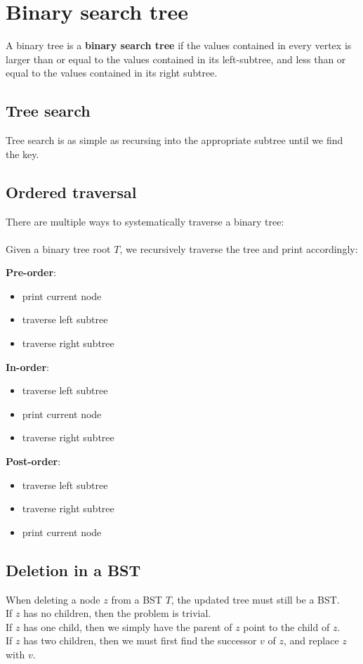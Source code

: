 \documentclass[a4paper]{article}
\begin{document}
\section{Binary search tree}
A binary tree is a \textbf{binary search tree} if the values contained in every vertex is larger than or equal to the values contained in its left-subtree, and less than or equal to the values contained in its right subtree.\\
\subsection{Tree search}
Tree search is as simple as recursing into the appropriate subtree until we find the key.
\subsection{Ordered traversal}
There are multiple ways to systematically traverse a binary tree:\\ \\
Given a binary tree root $T$, we recursively traverse the tree and print accordingly:
\begin{multicols}{3}
\textbf{Pre-order}:
\begin{itemize}
	\itemsep0em
	\item print current node
	\item traverse left subtree
	\item traverse right subtree
\end{itemize}
\textbf{In-order}:
\begin{itemize}
	\itemsep0em
	\item traverse left subtree
	\item print current node
	\item traverse right subtree
\end{itemize}
\textbf{Post-order}:
\begin{itemize}
	\itemsep0em
	\item traverse left subtree
	\item traverse right subtree
	\item print current node
\end{itemize}
\end{multicols}
\subsection{Deletion in a BST}
When deleting a node $z$ from a BST $T$, the updated tree must still be a BST.\\
If $z$ has no children, then the problem is trivial.\\
If $z$ has one child, then we simply have the parent of $z$ point to the child of $z$.\\
If $z$ has two children, then we must first find the successor $v$ of $z$, and replace $z$ with $v$.
\end{document}
